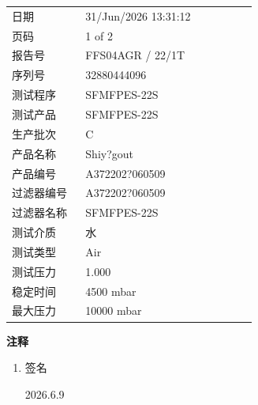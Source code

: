 \documentclass[UTF8,10pt,a4paper,fontset=fandol]{ctexart}
\newcommand{\fieldvalue}[1]{#1}
\newcommand{\handwritten}[1]{#1}
\begin{document}
\begin{tabular}{@{}p{0.27\linewidth}p{0.63\linewidth}@{}}
日期 &
\fieldvalue{31/Jun/2026 13:31:12}
\\
页码 &
\fieldvalue{1 of 2}
\\
报告号 &
\fieldvalue{FFS04AGR / 22/1T}
\\
序列号 &
\fieldvalue{32880444096}
\\
测试程序 &
\fieldvalue{SFMFPES-22S}
\\
测试产品 &
\fieldvalue{SFMFPES-22S}
\\
生产批次 &
\fieldvalue{C}
\\
产品名称 &
\fieldvalue{Shiy?gout}
\\
产品编号 &
\fieldvalue{A372202?060509}
\\
过滤器编号 &
\fieldvalue{A372202?060509}
\\
过滤器名称 &
\fieldvalue{SFMFPES-22S}
\\
测试介质 &
\fieldvalue{水}
\\
测试类型 &
\fieldvalue{Air}
\\
测试压力 &
\fieldvalue{1.000}
\\
稳定时间 &
\fieldvalue{4500 mbar}
\\
最大压力 &
\fieldvalue{10000 mbar}
\end{tabular}

\vspace{1em}
\textbf{注释}

\begin{enumerate}
\item 签名

\handwritten{2026.6.9}
\end{enumerate}
\end{document}
